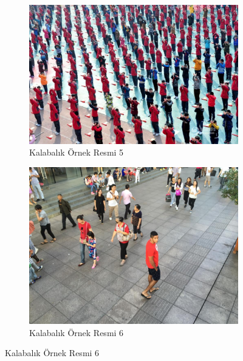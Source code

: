 \documentclass[10pt,a4paper]{report}
\begin{document}
	
	\begin{figure}[!h]
		\begin{subfigure}{\textwidth}
			\raggedright
			\includegraphics[width=\textwidth]{NPWU2}
			\caption{Kalabalık Örnek Resmi 5 \cite{wang2020nwpu}}
			\label{Ornek5}
		\end{subfigure}
		\begin{subfigure}{\textwidth}
			\raggedright
			\includegraphics[width=\textwidth]{ornek6.jpg}
			\caption{Kalabalık Örnek Resmi 6 \cite{shanghaitechdataset}}
			\label{Ornek6}
		\end{subfigure}
	\end{figure}
	
\end{document}

